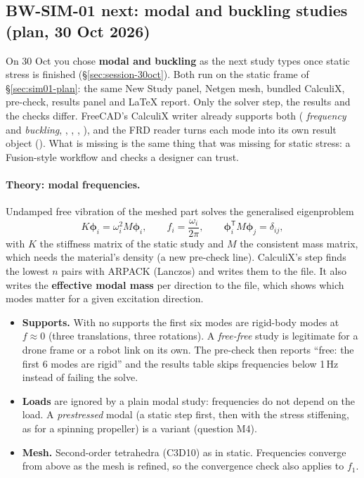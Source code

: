 \subsection{BW-SIM-01 next: modal and buckling studies (plan, 30 Oct 2026)}\label{sec:sim-modal-plan}

On 30 Oct you chose \textbf{modal and buckling} as the next study types once static stress is finished
(\S\ref{sec:session-30oct}). Both run on the static frame of \S\ref{sec:sim01-plan}: the same New Study panel,
Netgen mesh, bundled CalculiX, pre-check, results panel and \LaTeX{} report. Only the solver step, the
results and the checks differ. FreeCAD's CalculiX writer already supports both
( \emph{frequency} and \emph{buckling}, , ,
, ), and the FRD reader turns each mode into its own result
object (). What is missing is the same thing that was missing for
static stress: a Fusion-style workflow and checks a designer can trust.

\paragraph{Theory: modal frequencies.} Undamped free vibration of the meshed part solves the generalised
eigenproblem
\[
  K\boldsymbol\phi_i=\omega_i^2 M\boldsymbol\phi_i,\qquad f_i=\frac{\omega_i}{2\pi},\qquad
  \boldsymbol\phi_i^{\mathsf T}M\boldsymbol\phi_j=\delta_{ij},
\]
with $K$ the stiffness matrix of the static study and $M$ the consistent mass matrix, which needs the
material's density (a new pre-check line). CalculiX's  step finds the lowest $n$ pairs with
ARPACK (Lanczos) and writes them to the  file. It also writes the \textbf{effective modal mass} per
direction to the  file, which shows which modes matter for a given excitation direction.
\begin{itemize}
  \item \textbf{Supports.} With no supports the first six modes are rigid-body modes at $f\approx0$ (three
        translations, three rotations). A \emph{free-free} study is legitimate for a drone frame or a robot
        link on its own. The pre-check then reports ``free: the first 6 modes are rigid'' and the results
        table skips frequencies below 1\,Hz instead of failing the solve.
  \item \textbf{Loads} are ignored by a plain modal study: frequencies do not depend on the load. A
        \emph{prestressed} modal (a static step first, then  with the stress stiffening, as
        for a spinning propeller) is a variant (question M4).
  \item \textbf{Mesh.} Second-order tetrahedra (C3D10) as in static. Frequencies converge from above as the
        mesh is refined, so the  convergence check also applies to $f_1$.
\end{itemize}

